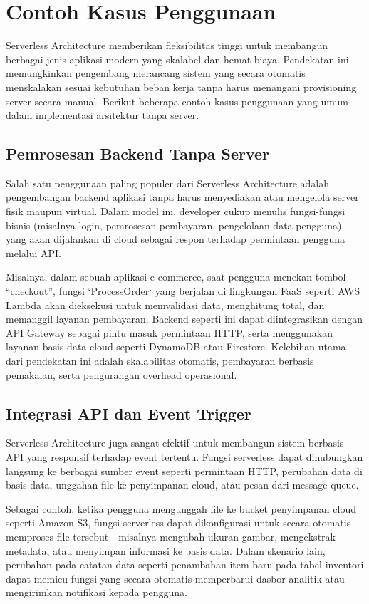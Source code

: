 \section{Contoh Kasus Penggunaan}

Serverless Architecture memberikan fleksibilitas tinggi untuk membangun berbagai jenis aplikasi modern yang skalabel dan hemat biaya. Pendekatan ini memungkinkan pengembang merancang sistem yang secara otomatis menskalakan sesuai kebutuhan beban kerja tanpa harus menangani provisioning server secara manual. Berikut beberapa contoh kasus penggunaan yang umum dalam implementasi arsitektur tanpa server.

\subsection{Pemrosesan Backend Tanpa Server}

Salah satu penggunaan paling populer dari Serverless Architecture adalah pengembangan backend aplikasi tanpa harus menyediakan atau mengelola server fisik maupun virtual. Dalam model ini, developer cukup menulis fungsi-fungsi bisnis (misalnya login, pemrosesan pembayaran, pengelolaan data pengguna) yang akan dijalankan di cloud sebagai respon terhadap permintaan pengguna melalui API. 

Misalnya, dalam sebuah aplikasi e-commerce, saat pengguna menekan tombol “checkout”, fungsi `ProcessOrder` yang berjalan di lingkungan FaaS seperti AWS Lambda akan dieksekusi untuk memvalidasi data, menghitung total, dan memanggil layanan pembayaran. Backend seperti ini dapat diintegrasikan dengan API Gateway sebagai pintu masuk permintaan HTTP, serta menggunakan layanan basis data cloud seperti DynamoDB atau Firestore. Kelebihan utama dari pendekatan ini adalah skalabilitas otomatis, pembayaran berbasis pemakaian, serta pengurangan overhead operasional.

\subsection{Integrasi API dan Event Trigger}

Serverless Architecture juga sangat efektif untuk membangun sistem berbasis API yang responsif terhadap event tertentu. Fungsi serverless dapat dihubungkan langsung ke berbagai sumber event seperti permintaan HTTP, perubahan data di basis data, unggahan file ke penyimpanan cloud, atau pesan dari message queue.

Sebagai contoh, ketika pengguna mengunggah file ke bucket penyimpanan cloud seperti Amazon S3, fungsi serverless dapat dikonfigurasi untuk secara otomatis memproses file tersebut—misalnya mengubah ukuran gambar, mengekstrak metadata, atau menyimpan informasi ke basis data. Dalam skenario lain, perubahan pada catatan data seperti penambahan item baru pada tabel inventori dapat memicu fungsi yang secara otomatis memperbarui dasbor analitik atau mengirimkan notifikasi kepada pengguna.

